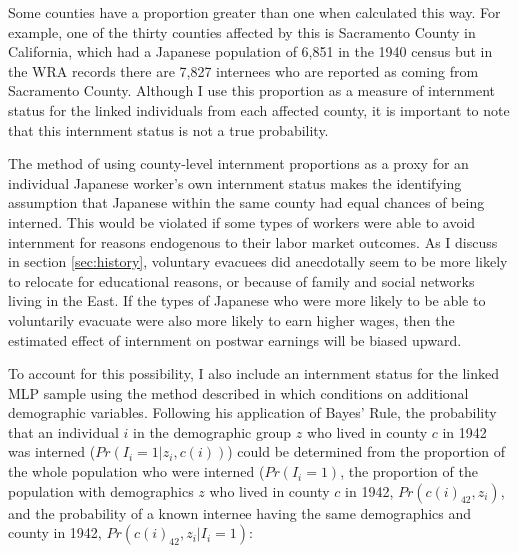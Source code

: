 

Some counties have a proportion greater than one when calculated this way.
For example, one of the thirty counties affected by this is 
Sacramento County in California,
which had a Japanese population of 6,851 in the 1940 census
but in the WRA records there are 7,827 internees who are reported
as coming from Sacramento County.
Although I use this proportion as a measure of internment status
for the linked individuals from each affected county,
it is important to note that this internment status is not a true probability.

The method of using county-level internment proportions
as a proxy for an individual Japanese worker's own internment status
makes the identifying assumption that
Japanese within the same county had equal chances of being interned.
This would be violated if some types of workers were able to avoid internment
for reasons endogenous to their labor market outcomes.
As I discuss in section \ref{sec:history},
voluntary evacuees did anecdotally seem to be more likely to relocate
for educational reasons,
or because of family and social networks living in the East.
If the types of Japanese who were more likely to be able to voluntarily evacuate
were also more likely to earn higher wages,
then the estimated effect of internment on postwar earnings will
be biased upward.

To account for this possibility,
I also include an internment status for the linked MLP sample
using the method described in 
\cite{arellano-boverDisplacementDiversityMobility2022}
which conditions on additional demographic variables.
Following his application of Bayes' Rule, 
the probability that an individual $i$ 
in the demographic group $z$ who lived in county $c$ in 1942 was interned
($Pr(I_{i}=1|z_i,c(i))$)
could be determined from the proportion of the whole population who were interned 
($Pr(I_{i}=1)$,
the proportion of the population with demographics $z$ 
who lived in county $c$ in 1942, $Pr(c(i)_{42}, z_i)$,
and the probability of a known internee 
having the same demographics and county in 1942,
$Pr(c(i)_{42}, z_i|I_i=1)$:

